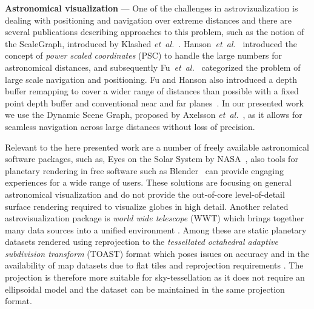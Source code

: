 \documentclass[journal]{vgtc}                %
\newcommand{\etal}{\emph{et~al.}}
\begin{document}
\noindent\textbf{Astronomical visualization} ---
One of the challenges in astrovizualization is dealing with positioning and navigation over extreme distances and there are several publications describing approaches to this problem, such as the notion of the ScaleGraph, introduced by Klashed \etal~\cite{KHECY10}.
Hanson~\etal~\cite{hanson2000very} introduced the concept of \emph{power scaled coordinates} (PSC) to handle the large numbers for astronomical distances, and subsequently Fu~\etal~\cite{fu2006navigation} categorized the problem of large scale navigation and positioning. Fu and Hanson also introduced a depth buffer remapping to cover a wider range of distances than possible with a fixed point depth buffer and conventional near and far planes~\cite{fu2007transparently}.
In our presented work we use the Dynamic Scene Graph, proposed by Axelsson \etal~\cite{Axelsson2017Dynamic}, as it allows for seamless navigation across large distances without loss of precision.

Relevant to the here presented work are a number of freely available astronomical software packages, such as, Eyes on the Solar System by NASA~\cite{hussey2010eyes}, also tools for planetary rendering in free software such as Blender~\cite{kent2013visualizing, naiman2016astroblend} can provide engaging experiences for a wide range of users. These solutions are focusing on general astronomical visualization and do not provide the out-of-core level-of-detail surface rendering required to visualize globes in high detail. Another related astrovisualization package is \emph{world wide telescope} (WWT) which brings together many data sources into a unified environment \cite{ali2011online, goodman2012worldwide}. Among these are static planetary datasets rendered using reprojection to the \emph{tessellated octahedral adaptive subdivision transform} (TOAST) format which poses issues on accuracy and in the availability of map datasets due to flat tiles and reprojection requirements \cite{berriman2017application}. The projection is therefore more suitable for sky-tessellation as it does not require an ellipsoidal model and the dataset can be maintained in the same projection format.
\end{document}
